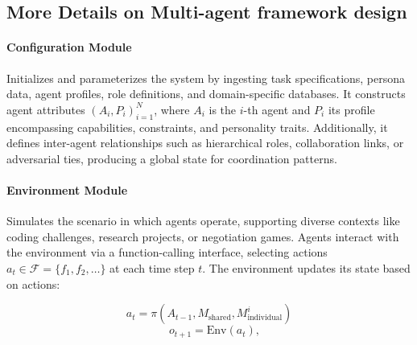 \paragraph{}










\subsection{More Details on Multi-agent framework design}
\label{framework}

\paragraph{Configuration Module}
Initializes and parameterizes the system by ingesting task specifications, persona data, agent profiles, role definitions, and domain-specific databases. It constructs agent attributes ${(A_i, P_i)}_{i=1}^{N}$, where $A_i$ is the $i$-th agent and $P_i$ its profile encompassing capabilities, constraints, and personality traits. Additionally, it defines inter-agent relationships such as hierarchical roles, collaboration links, or adversarial ties, producing a global state for coordination patterns.

\paragraph{Environment Module}
Simulates the scenario in which agents operate, supporting diverse contexts like coding challenges, research projects, or negotiation games. Agents interact with the environment via a function-calling interface, selecting actions $a_t \in \mathcal{F} = \{f_1, f_2, \dots\}$ at each time step $t$. The environment updates its state based on actions:

\[
a_t = \pi(A_{t-1}, M_{\text{shared}}, M_{\text{individual}}^i)
\]
\[
\quad o_{t+1} = \text{Env}(a_t),
\]

